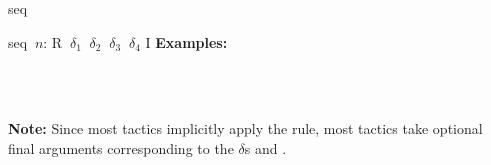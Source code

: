 \begin{tactic}{seq}
\begin{tsyntax}{seq $\ n$: R $\ \delta_1$ $\ \delta_2$ $\ \delta_3$ $\ \delta_4$ I}
  \textbf{Examples:}
  \begin{mathpar}
    {}%
    \quad{}\\%
    {}%
    \quad{}\\%
  \end{mathpar}

  \textbf{Note:} Since most tactics implicitly apply the 
  rule, most \phl tactics take optional final arguments corresponding
  to the $\delta$s and .
  \end{tsyntax}
\end{tactic}
